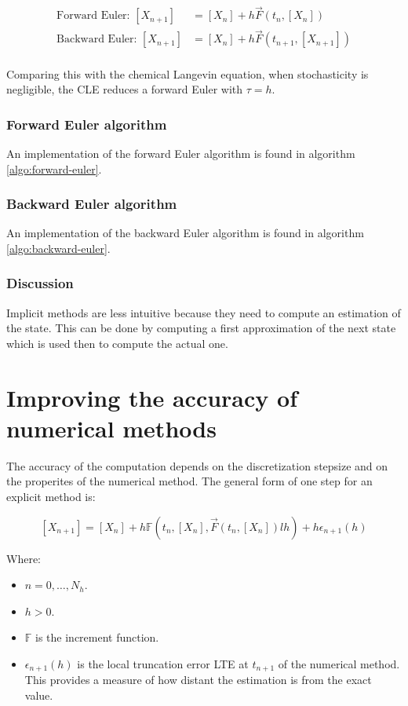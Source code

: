   \begin{align*}
    \text{Forward Euler: } [X_{n+1}] &= [X_n] + h\vec{F}(t_n, [X_n])\\
    \text{Backward Euler: } [X_{n+1}] &= [X_n] + h\vec{F}(t_{n+1}, [X_{n+1}])\\
  \end{align*}

  Comparing this with the chemical Langevin equation, when stochasticity is negligible, the CLE reduces a forward Euler with $\tau=h$.

    \subsubsection{Forward Euler algorithm}
    An implementation of the forward Euler algorithm is found in algorithm \ref{algo:forward-euler}.

    

    \subsubsection{Backward Euler algorithm}
    An implementation of the backward Euler algorithm is found in algorithm \ref{algo:backward-euler}.

    

    \subsubsection{Discussion}
    Implicit methods are less intuitive because they need to compute an estimation of the state.
    This can be done by computing a first approximation of the next state which is used then to compute the actual one.



\section{Improving the accuracy of numerical methods}
The accuracy of the computation depends on the discretization stepsize and on the properites of the numerical method.
The general form of one step for an explicit method is:

$$[X_{n+1}] = [X_n] +h\mathbb{F}(t_n, [X_n], \vec{F}(t_n, [X_n])lh) + h\epsilon_{n+1}(h)$$

Where:

\begin{multicols}{2}
  \begin{itemize}
    \item $n = 0, \dots, N_h$.
    \item $h>0$.
    \item $\mathbb{F}$ is the increment function.
    \item $\epsilon_{n+1}(h)$ is the local truncation error LTE at $t_{n+1}$ of the numerical method.
      This provides a measure of how distant the estimation is from the exact value.
  \end{itemize}
\end{multicols}

